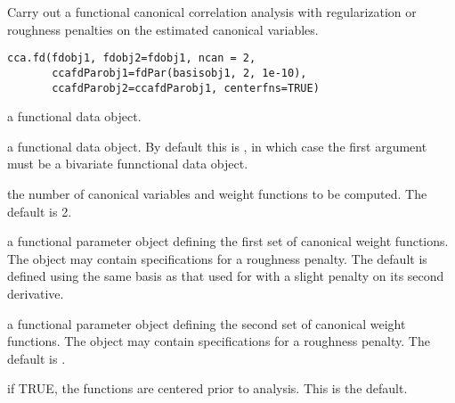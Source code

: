 \begin{Description}\relax
Carry out a functional canonical correlation analysis with
regularization or roughness penalties on the estimated
canonical variables.
\end{Description}
\begin{Usage}
\begin{verbatim}
cca.fd(fdobj1, fdobj2=fdobj1, ncan = 2,
       ccafdParobj1=fdPar(basisobj1, 2, 1e-10),
       ccafdParobj2=ccafdParobj1, centerfns=TRUE)
\end{verbatim}
\end{Usage}
\begin{Arguments}
\begin{ldescription}
\item[\code{fdobj1}] a functional data object.

\item[\code{fdobj2}] a functional data object.  By default this is , in
which case the first argument must be a bivariate funnctional data
object.

\item[\code{ncan}] the number of canonical variables and weight functions to be
computed.  The default is 2.

\item[\code{ccafdParobj1}] a functional parameter object defining the first set of canonical
weight functions.  The object may contain specifications for a
roughness penalty. The default is defined using the same basis
as that used for  with a slight penalty on its
second derivative.

\item[\code{ccafdParobj2}] a functional parameter object defining the second set of canonical
weight functions.  The object may contain specifications for a
roughness penalty. The default is .

\item[\code{centerfns}] if TRUE, the functions are centered prior to analysis. This is the
default.

\end{ldescription}
\end{Arguments}
